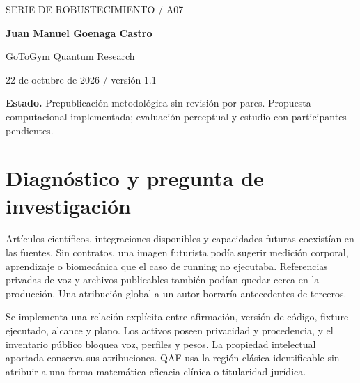 \documentclass[10pt,a4paper]{article}
\begin{document}
\begin{center}{\sffamily\small\textcolor{mint}{SERIE DE ROBUSTECIMIENTO / A07}}\par\vspace{10pt}{\sffamily\LARGE\bfseries\textcolor{ink}{Evidencia, propiedad intelectual y publicación}}\par\vspace{7pt}{\large Compuertas QAF para afirmaciones y activos}\par\vspace{12pt}\textbf{Juan Manuel Goenaga Castro}\par GoToGym Quantum Research\par 22 de octubre de 2026 / versión 1.1\end{center}\colorbox{ink!6}{\parbox{.96\linewidth}{\small\textbf{Estado.} Prepublicación metodológica sin revisión por pares. Propuesta computacional implementada; evaluación perceptual y estudio con participantes pendientes.}}\begin{abstract}Se implementa una relación explícita entre afirmación, versión de código, fixture ejecutado, alcance y plano. Los activos poseen privacidad y procedencia, y el inventario público bloquea voz, perfiles y pesos. La propiedad intelectual aportada conserva sus atribuciones. QAF usa la región clásica identificable sin atribuir a una forma matemática eficacia clínica o titularidad jurídica. Se presenta el problema observado, una formalización con unidades y restricciones, el código correspondiente y sus controles. Se distingue la verificación de ingeniería de calidad percibida, identidad regional y efecto comercial. El uso QAF corresponde a la región clásica identificable y conserva un comparador con los mismos recursos.\end{abstract}
\section{Diagnóstico y pregunta de investigación}
Artículos científicos, integraciones disponibles y capacidades futuras coexistían en las fuentes. Sin contratos, una imagen futurista podía sugerir medición corporal, aprendizaje o biomecánica que el caso de running no ejecutaba. Referencias privadas de voz y archivos publicables también podían quedar cerca en la producción. Una atribución global a un autor borraría antecedentes de terceros.

Se implementa una relación explícita entre afirmación, versión de código, fixture ejecutado, alcance y plano. Los activos poseen privacidad y procedencia, y el inventario público bloquea voz, perfiles y pesos. La propiedad intelectual aportada conserva sus atribuciones. QAF usa la región clásica identificable sin atribuir a una forma matemática eficacia clínica o titularidad jurídica.
\end{document}
